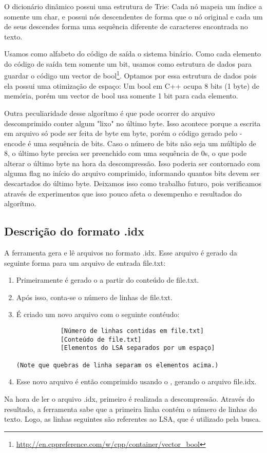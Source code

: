 \subsubsection{\lz}
O dicionário dinâmico possui uma estrutura de Trie: Cada nó mapeia um índice a
somente um char, e possui nós descendentes de forma que o nó original e cada um
de seus descendes forma uma sequência diferente de caracteres encontrada no
texto.

Usamos como alfabeto do código de saída o sistema binário. Como cada elemento do
código de saída tem somente um bit, usamos como estrutura de dados para guardar
o código um vector de
bool\footnote{\url{http://en.cppreference.com/w/cpp/container/vector_bool}}.
Optamos por essa estrutura de dados pois ela possui uma otimização de espaço:
Um bool em C++ ocupa 8 bits (1 byte) de memória, porém um vector de
bool usa somente 1 bit para cada elemento.

Outra peculiaridade desse algorítmo é que pode ocorrer do arquivo descomprimido
conter algum "lixo" no último byte. Isso acontece porque a escrita em arquivo só
pode ser feita de byte em byte, porém o código gerado pelo \lz-encode é uma
sequência de bits. Caso o número de bits não seja um múltiplo de 8, o último
byte precisa ser preenchido com uma sequência de 0s, o que pode alterar o último
byte na hora da descompressão. Isso poderia ser contornado com alguma flag no
início do arquivo comprimido, informando quantos bits devem ser descartados do
último byte. Deixamos isso como trabalho futuro, pois verificamos através de
experimentos que isso pouco afeta o desempenho e resultados do algorítmo.

\subsection{Descrição do formato .idx}

A ferramenta \ipmt gera e lê arquivos no formato .idx. Esse arquivo é gerado da
seguinte forma para um arquivo de entrada file.txt:

\begin{enumerate}

\item Primeiramente é gerado o \lsa a partir do conteúdo de file.txt.
\item Após isso, conta-se o número de linhas de file.txt.
\item É criado um novo arquivo com o seguinte contéudo:
\begin{verbatim}
            [Número de linhas contidas em file.txt]
            [Conteúdo de file.txt]
            [Elementos do LSA separados por um espaço]

(Note que quebras de linha separam os elementos acima.)
\end{verbatim}
\item Esse novo arquivo é então comprimido usando o \lz, gerando o arquivo file.idx.

\end{enumerate}

Na hora de ler o arquivo .idx, primeiro é realizada a descompressão. Através do
resultado, a ferramenta sabe que a primeira linha contém o número de linhas do
texto. Logo, as linhas seguintes são referentes ao LSA, que é utilizado pela
busca.
